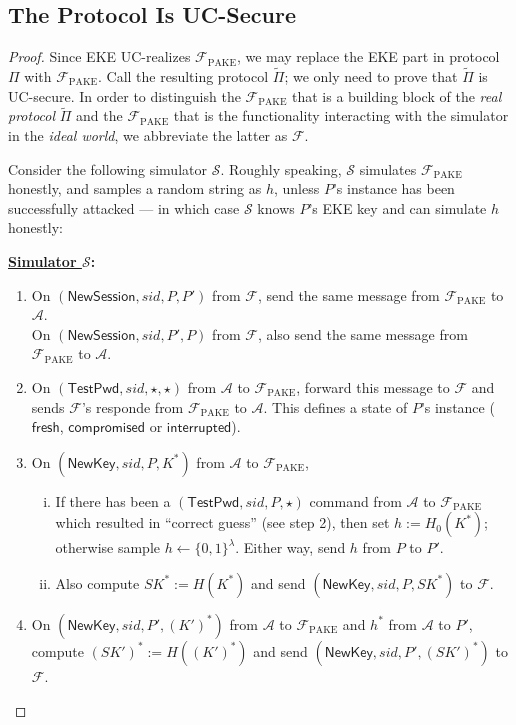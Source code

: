 \documentclass{article}
\newcommand{\adv}{\mathcal{A}}
\renewcommand{\sim}{\mathcal{S}}
\newcommand{\func}{\mathcal{F}}
\newcommand{\Fpake}{\func_\mathrm{PAKE}}
\newcommand{\NewSession}{\mathsf{NewSession}}
\newcommand{\TestPwd}{\mathsf{TestPwd}}
\newcommand{\NewKey}{\mathsf{NewKey}}
\newcommand{\fresh}{\mathsf{fresh}}
\newcommand{\compromised}{\mathsf{compromised}}
\newcommand{\interrupted}{\mathsf{interrupted}}
\begin{document}
\subsection{The Protocol Is UC-Secure}
\begin{proof}
Since EKE UC-realizes $\Fpake$, we may replace the EKE part in protocol $\Pi$ with $\Fpake$. Call the resulting protocol $\tilde{\Pi}$; we only need to prove that $\tilde{\Pi}$ is UC-secure. In order to distinguish the $\Fpake$ that is a building block of the \emph{real protocol} $\tilde{\Pi}$ and the $\Fpake$ that is the functionality interacting with the simulator in the \emph{ideal world}, we abbreviate the latter as $\func$.

Consider the following simulator $\sim$. Roughly speaking, $\sim$ simulates $\Fpake$ honestly, and samples a random string as $h$, unless $P$'s instance has been successfully attacked --- in which case $\sim$ knows $P$'s EKE key and can simulate $h$ honestly:

\bigskip\noindent\textbf{\underline{Simulator $\sim$}:}
\begin{enumerate}
  \item On $(\NewSession, sid, P, P')$ from $\func$, send the same message from $\Fpake$ to $\adv$. \\
      On $(\NewSession, sid, P', P)$ from $\func$, also send the same message from $\Fpake$ to $\adv$.
  \item On $(\TestPwd, sid, \star, \star)$ from $\adv$ to $\Fpake$, forward this message to $\func$ and sends $\func$'s responde from $\Fpake$ to $\adv$. This defines a state of $P$'s instance ($\fresh$, $\compromised$ or $\interrupted$).
  \item On $(\NewKey, sid, P, K^*)$ from $\adv$ to $\Fpake$,
      \begin{enumerate}[(i)]
        \item If there has been a $(\TestPwd, sid, P, \star)$ command from $\adv$ to $\Fpake$ which resulted in ``correct guess'' (see step 2), then set $h := H_0(K^*)$; otherwise sample $h \gets \{0,1\}^\lambda$. Either way, send $h$ from $P$ to $P'$.
        \item Also compute $SK^* := H(K^*)$ and send $(\NewKey, sid, P, SK^*)$ to $\func$.
      \end{enumerate}
  \item On $(\NewKey, sid, P', (K')^*)$ from $\adv$ to $\Fpake$ and $h^*$ from $\adv$ to $P'$, compute $(SK')^* := H((K')^*)$ and send $(\NewKey, sid, P', (SK')^*)$ to $\func$.
\end{enumerate}


\end{proof}
\end{document}
